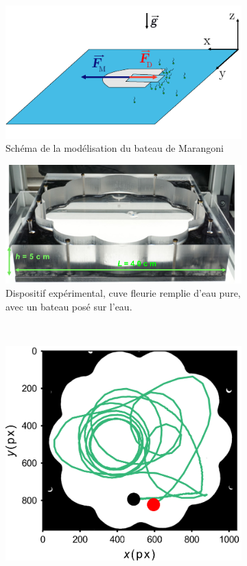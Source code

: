 \documentclass[french, 10pt]{article}
\begin{document}
\begin{figure}[ht]
  \centering
  \begin{subfigure}[b]{0.45\textwidth}
      \centering
      \includegraphics[width=.7\textwidth]{./figures/SchemaModeleBateau.pdf}
	  \caption{Schéma de la modélisation du bateau de Marangoni}
	  \label{fig:schema}
  \end{subfigure}
  \hfill
  \begin{subfigure}[b]{0.45\textwidth}
    \centering
    \includegraphics[width=.7\textwidth]{Cuvefleurie.png}
  \caption{Dispositif expérimental, cuve fleurie remplie d'eau pure, avec un bateau posé sur l'eau.}
  \label{fig:cuve}
\end{subfigure}\\
\begin{subfigure}[b]{0.45\textwidth}
  \centering
  \includegraphics[width=.7\textwidth]{SuiviBateau.png}

\end{subfigure}
\end{figure}
\end{document}
